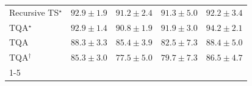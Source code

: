 \begin{tabular}{l|cccc|}
Recursive TS$^\star$ & {\cellcolor[HTML]{034D79}} \color[HTML]{F1F1F1} $92.9\pm 1.9$ & {\cellcolor[HTML]{045788}} \color[HTML]{F1F1F1} $91.2\pm 2.4$ & {\cellcolor[HTML]{045788}} \color[HTML]{F1F1F1} $91.3\pm 5.0$ & {\cellcolor[HTML]{045280}} \color[HTML]{F1F1F1} $92.2\pm 3.4$ \\
TQA$^\star$ & {\cellcolor[HTML]{034D79}} \color[HTML]{F1F1F1} $92.9\pm 1.4$ & {\cellcolor[HTML]{045A8D}} \color[HTML]{F1F1F1} $90.8\pm 1.9$ & {\cellcolor[HTML]{045382}} \color[HTML]{F1F1F1} $91.9\pm 3.0$ & {\cellcolor[HTML]{03456C}} \color[HTML]{F1F1F1} $94.2\pm 2.1$ \\
TQA & {\cellcolor[HTML]{04649D}} \color[HTML]{F1F1F1} $88.3\pm 3.3$ & {\cellcolor[HTML]{056FAE}} \color[HTML]{F1F1F1} $85.4\pm 3.9$ & {\cellcolor[HTML]{1B7EB7}} \color[HTML]{F1F1F1} $82.5\pm 7.3$ & {\cellcolor[HTML]{04639B}} \color[HTML]{F1F1F1} $88.4\pm 5.0$ \\
TQA$^\dagger$ & {\cellcolor[HTML]{056FAE}} \color[HTML]{F1F1F1} $85.3\pm 3.0$ & {\cellcolor[HTML]{4A98C5}} \color[HTML]{F1F1F1} $77.5\pm 5.0$ & {\cellcolor[HTML]{348EBF}} \color[HTML]{F1F1F1} $79.7\pm 7.3$ & {\cellcolor[HTML]{056BA7}} \color[HTML]{F1F1F1} $86.5\pm 4.7$ \\
\cline{1-5}
\bottomrule
\end{tabular}
